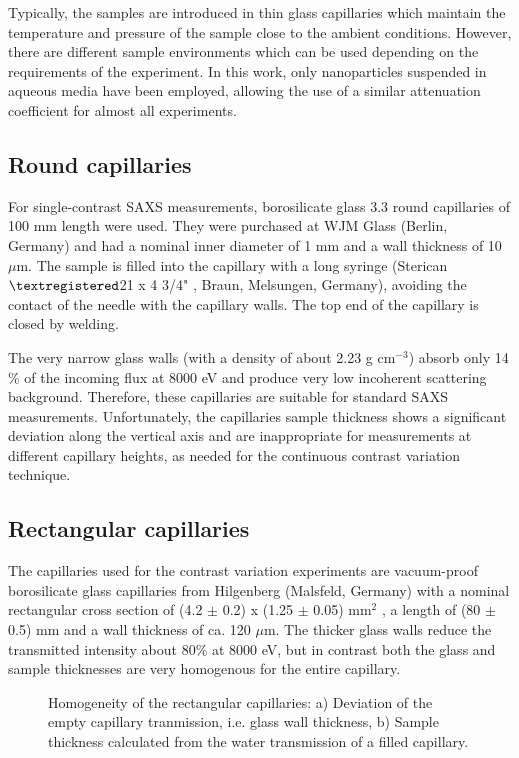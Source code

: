 Typically, the samples are introduced in thin glass capillaries which maintain the temperature and pressure of the sample close to the ambient conditions. However, there are different sample environments which can be used depending on the requirements of the experiment. In this work, only nanoparticles suspended in aqueous media have been employed, allowing the use of a similar attenuation coefficient for almost all experiments.

\subsection{Round capillaries}

For single-contrast SAXS measurements, borosilicate glass 3.3 round capillaries of 100 mm length were used. They were purchased at WJM Glass (Berlin, Germany) and had a nominal inner diameter of 1 mm and a wall thickness of 10 $\mu$m. The sample is filled into the capillary with a long syringe (Sterican$\textregistered$21 x 4 3/4" , Braun, Melsungen, Germany), avoiding the contact of the needle with the capillary walls. The top end of the capillary is closed by welding.

The very narrow glass walls (with a density of about 2.23 g cm$^{-3}$) absorb only 14 $\%$ of the incoming flux at 8000 eV and produce very low incoherent scattering background. Therefore, these capillaries are suitable for standard SAXS measurements. Unfortunately, the capillaries sample thickness shows a significant deviation along the vertical axis and are inappropriate for measurements at different capillary heights, as needed for the continuous contrast variation technique.

\subsection{Rectangular capillaries}

The capillaries used for the contrast variation experiments are vacuum-proof borosilicate glass capillaries from Hilgenberg (Malsfeld, Germany) with a nominal rectangular cross section of (4.2 $\pm$ 0.2) x (1.25 $\pm$ 0.05) mm$^2$ , a length of (80 $\pm$ 0.5) mm and a wall thickness of ca. 120 $\mu$m. The thicker glass walls reduce the transmitted intensity about $80\%$ at 8000 eV, but in contrast both the glass and sample thicknesses are very homogenous for the entire capillary.

\begin{figure}%
	\centering
		\caption{Homogeneity of the rectangular capillaries: a) Deviation of the empty capillary tranmission, i.e. glass wall thickness, b) Sample thickness calculated from the water transmission of a filled capillary. }
\end{figure}

